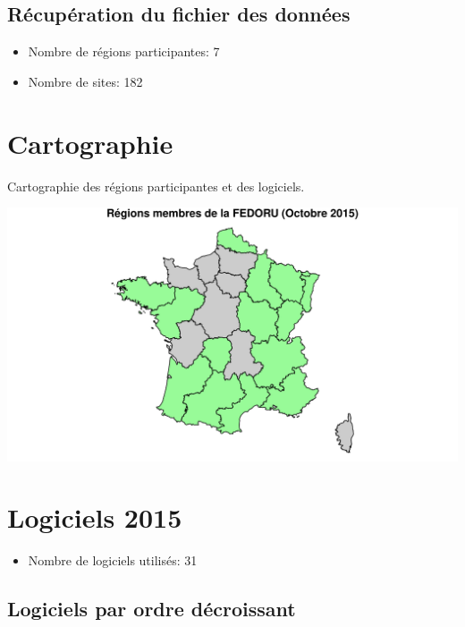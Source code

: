\documentclass[]{article}
\begin{document}
\subsection{Récupération du fichier des
données}\label{recuperation-du-fichier-des-donnees}

\begin{itemize}
\itemsep1pt\parskip0pt
\item
  Nombre de régions participantes: 7
\item
  Nombre de sites: 182
\end{itemize}

\section{Cartographie}\label{cartographie}

Cartographie des régions participantes et des logiciels.

\includegraphics{septembre2015_files/figure-latex/carto_region-1.pdf}

\section{Logiciels 2015}\label{logiciels-2015}

\begin{itemize}
\itemsep1pt\parskip0pt
\item
  Nombre de logiciels utilisés: 31
\end{itemize}

\subsection{Logiciels par ordre
décroissant}\label{logiciels-par-ordre-decroissant}
\end{document}

